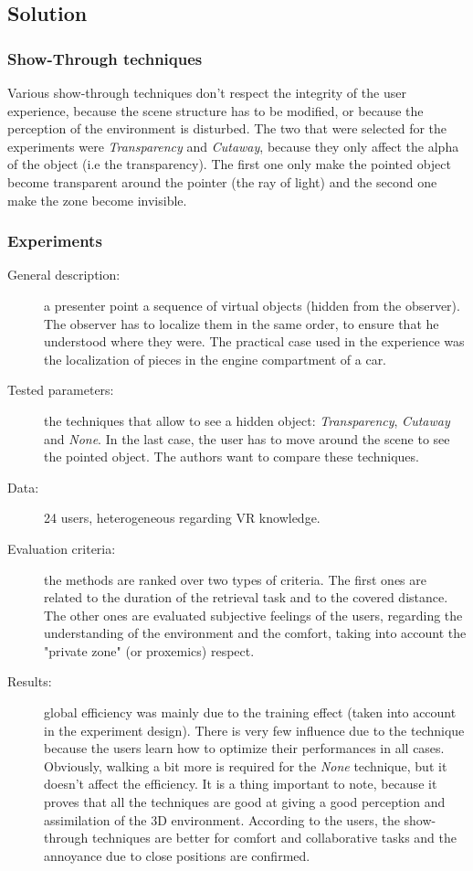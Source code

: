 \documentclass[a4paper]{article}
\begin{document}
\subsection{Solution}

\subsubsection{Show-Through techniques}
Various show-through techniques don't respect the integrity of the user experience, because the scene structure has to be modified, or because the perception of the environment is disturbed. The two that were selected for the experiments were \textit{Transparency} and \textit{Cutaway}, because they only affect the alpha of the object (i.e the transparency). The first one only make the pointed object become transparent around the pointer (the ray of light) and the second one make the zone become invisible.

\subsubsection{Experiments}
\begin{description}
	\item[General description:] a presenter point a sequence of virtual objects (hidden from the observer). The observer has to localize them in the same order, to ensure that he understood where they were. The practical case used in the experience was the localization of pieces in the engine compartment of a car.
	\item[Tested parameters:] the techniques that allow to see a hidden object: \textit{Transparency}, \textit{Cutaway} and \textit{None}. In the last case, the user has to move around the scene to see the pointed object. The authors want to compare these techniques.
	\item[Data:] 24 users, heterogeneous regarding VR knowledge.
	\item[Evaluation criteria:] the methods are ranked over two types of criteria. The first ones are related to the duration of the retrieval task and to the covered distance. The other ones are evaluated subjective feelings of the users, regarding the understanding of the environment and the comfort, taking into account the "private zone" (or proxemics) respect.
	\item[Results:] global efficiency was mainly due to the training effect (taken into account in the experiment design). There is very few influence due to the technique because the users learn how to optimize their performances in all cases. Obviously, walking a bit more is required for the \textit{None} technique, but it doesn't affect the efficiency. It is a thing important to note, because it proves that all the techniques are good at giving a good perception and assimilation of the 3D environment. According to the users, the show-through techniques are better for comfort and collaborative tasks and the annoyance due to close positions are confirmed.
\end{description}
\end{document}
